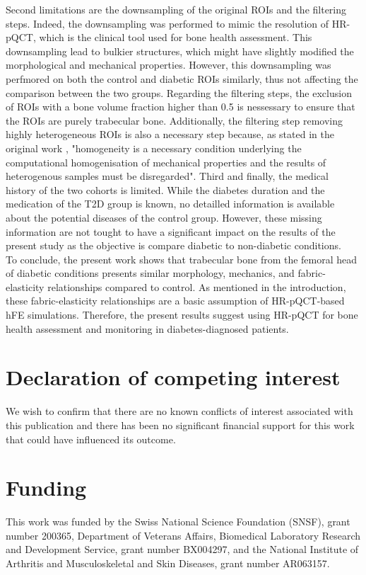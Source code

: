 \documentclass[a4paper,fleqn]{DC_ArtStyle}
\begin{document}
	Second limitations are the downsampling of the original ROIs and the filtering steps.
	Indeed, the downsampling was performed to mimic the resolution of HR-pQCT, which is the clinical tool used for bone health assessment.
	This downsampling lead to bulkier structures, which might have slightly modified the morphological and mechanical properties.
	However, this downsampling was perfmored on both the control and diabetic ROIs similarly, thus not affecting the comparison between the two groups.
	Regarding the filtering steps, the exclusion of ROIs with a bone volume fraction higher than 0.5 is nessessary to ensure that the ROIs are purely trabecular bone.
	Additionally, the filtering step removing highly heterogeneous ROIs is also a necessary step because, as stated in the original work \cite{Simon2022}, "homogeneity is a necessary condition underlying the computational homogenisation of mechanical properties and the results of heterogenous samples must be disregarded".
	Third and finally, the medical history of the two cohorts is limited.
	While the diabetes duration and the medication of the T2D group is known, no detailled information is available about the potential diseases of the control group.
	However, these missing information are not tought to have a significant impact on the results of the present study as the objective is compare diabetic to non-diabetic conditions.
	\\[0.5em]
	To conclude, the present work shows that trabecular bone from the femoral head of diabetic conditions presents similar morphology, mechanics, and fabric-elasticity relationships compared to control.
	As mentioned in the introduction, these fabric-elasticity relationships are a basic assumption of HR-pQCT-based hFE simulations.
	Therefore, the present results suggest using HR-pQCT for bone health assessment and monitoring in diabetes-diagnosed patients.

	
	\section*{Declaration of competing interest}
	We wish to confirm that there are no known conflicts of interest associated with this publication and there has been no significant financial support for this work that could have influenced its outcome.
	
	\section*{Funding}
	This work was funded by the Swiss National Science Foundation (SNSF), grant number 200365, Department of Veterans Affairs, Biomedical Laboratory Research and Development Service, grant number BX004297, and the National Institute of Arthritis and Musculoskeletal and Skin Diseases, grant number AR063157.
\end{document}
